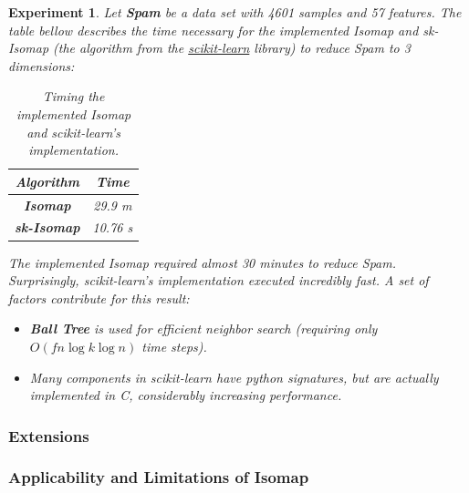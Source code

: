 \documentclass[12pt]{article}
\newtheorem{experiment}{Experiment}[section]
\begin{document}
\begin{experiment}
	Let \textbf{Spam} be a data set with 4601 samples and 57 features. The table bellow describes the time necessary for the implemented Isomap and sk-Isomap (the algorithm from the \href{http://scikit-learn.org}{scikit-learn} library) to reduce Spam to 3 dimensions:
	
	\begin{table}[H]
		\centering
		\begin{tabular}{|c|c|}
			\hline
			\textbf{Algorithm} & Time \\\hline
			\textbf{Isomap} & 29.9 m \\\hline
			\textbf{sk-Isomap} & 10.76 s \\\hline
		\end{tabular}
		
		\caption{Timing the implemented Isomap and scikit-learn's implementation.}
	\end{table}

	The implemented Isomap required almost 30 minutes to reduce Spam.
	Surprisingly, scikit-learn's implementation executed incredibly fast. A set of factors contribute for this result:

	\begin{itemize}
		\item \textbf{Ball Tree} is used for efficient neighbor search (requiring only $O(f n \log k \log n)$ time steps).
		\item Many components in scikit-learn have python signatures, but are actually implemented in C, considerably increasing performance.
	\end{itemize}
	
\end{experiment}

\subsubsection{Extensions}


\subsubsection{Applicability and Limitations of Isomap}
\end{document}
